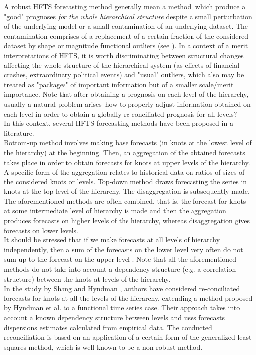 \documentclass[12pt,a4paper]{article}
\numberwithin{equation}{section}
\begin{document}
A robust HFTS forecasting method generally mean a method, which produce a "good" prognoses \emph{for the whole hierarchical structure} despite a small perturbation of the underlying model or a small contamination of an underlying dataset. The contamination comprises of a replacement of a certain fraction of the considered dataset by shape or magnitude functional outliers (see \cite{Riani}). In a context of a merit interpretations of HFTS, it is worth discriminating between structural changes affecting the whole structure of the hierarchical system (as effects of financial crashes, extraordinary political events) and "usual" outliers, which also may be treated as "packages" of important information but of a smaller scale/merit importance.
Note that after obtaining a prognosis on each level of the hierarchy, usually a natural problem arises--how to properly adjust information obtained on each level in order to obtain a globally re-conciliated prognosis for all levels?\\
In this context, several HFTS forecasting methods have been proposed in a literature.
\\ Bottom-up method involves making base forecasts (in knots at the lowest level of the hierarchy) at the beginning. Then, an aggregation of the obtained forecasts takes place in order to obtain forecasts for knots at upper levels of the hierarchy. A specific form of the aggregation relates to historical data on ratios of sizes of the considered knots or levels. Top-down method draws forecasting the series in knots at the top level of the hierarchy. The disaggregation is subsequently made. The aforementioned methods are often combined, that is, the forecast for knots at some intermediate level of hierarchy is made and then the aggregation produces forecasts on higher levels of the hierarchy, whereas disaggregation gives forecasts on lower levels.\\
It should be stressed that if we make forecasts at all levels of hierarchy independently, then a sum of the forecasts on the lower level very often do not sum up to the forecast on the upper level \cite{Hyndman2011}. Note that all the aforementioned methods do not take into account a dependency structure (e.g. a correlation structure) between the knots at levels of the hierarchy.
\\ In the study by Shang and Hyndman \cite{Shang}, authors have considered re-conciliated forecasts for knots at all the levels of the hierarchy, extending a method proposed by Hyndman et al.  \cite{Hyndman2011} to a functional time series case. Their approach takes into account a known dependency structure between levels and uses forecasts dispersions estimates calculated from empirical data. The conducted reconciliation is based on an application of a certain form of the generalized least squares method, which is well known to be a non-robust method.
\end{document}
